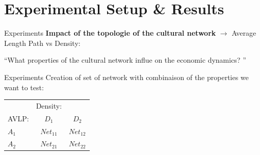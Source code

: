 \documentclass[12pt, handout=show,notes=show]{beamer}
\begin{document}
\section{Experimental Setup \& Results}
\begin{frame}{Experiments}
	\textbf{Impact of the topologie of the cultural network }
	$\rightarrow$ Average Length Path vs Density:\\
	\begin{center}
	    ``What properties of the cultural network influe on the economic dynamics? '' 
	\end{center}




\end{frame}

\begin{frame}{Experiments}
	Creation of set of network with combinaison of the properties we want to test:

    \begin{table}

	\centering
	\begin{tabular}{l|cc}
	    &Density: \\
	    AVLP: 	& $D_1$	 	& $D_2$\\\hline
	    $A_1$	& $Net_{11}$	& $Net_{12}$\\	
	    $A_2$	& $Net_{21}$	& $Net_{22}$\\	
	\end{tabular}
	\label{tab:net}
    \end{table}
\end{frame}
	 
\end{document}
